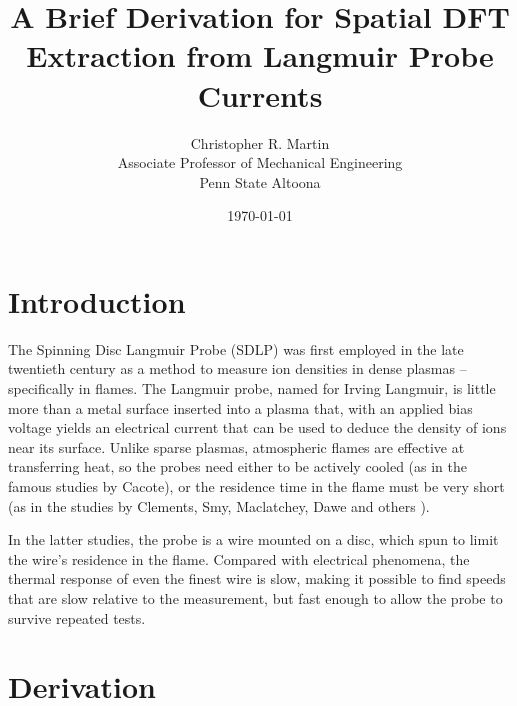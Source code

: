 \documentclass{article}
\title{A Brief Derivation for Spatial DFT Extraction from Langmuir Probe Currents}
\author{Christopher R. Martin\\Associate Professor of Mechanical Engineering\\Penn State Altoona}
\date{\today}
\begin{document}
\maketitle

\section{Introduction}

The Spinning Disc Langmuir Probe (SDLP) was first employed in the late twentieth century as a method to measure ion densities in dense plasmas -- specifically in flames.  The Langmuir probe, named for Irving Langmuir, is little more than a metal surface inserted into a plasma that, with an applied bias voltage yields an electrical current that can be used to deduce the density of ions near its surface.  Unlike sparse plasmas, atmospheric flames are effective at transferring heat, so the probes need either to be actively cooled (as in the famous studies by Cacote\cite{}), or the residence time in the flame must be very short (as in the studies by Clements, Smy, Maclatchey, Dawe and others \cite{}).  

In the latter studies, the probe is a wire mounted on a disc, which spun to limit the wire's residence in the flame.  Compared with electrical phenomena, the thermal response of even the finest wire is slow, making it possible to find speeds that are slow relative to the measurement, but fast enough to allow the probe to survive repeated tests.

\section{Derivation}
\end{document}
